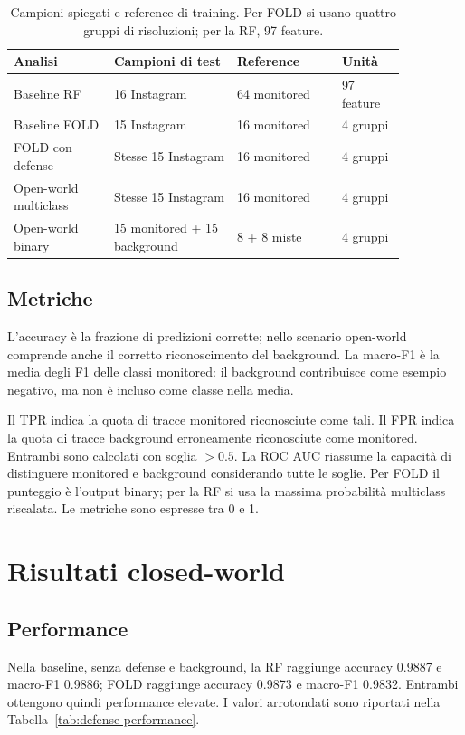\documentclass[11pt,a4paper]{article}
\begin{document}
\begin{table}[htbp]
\centering\small
\caption{Campioni spiegati e reference di training. Per FOLD si usano quattro gruppi di risoluzioni; per la RF, 97 feature.}
\label{tab:cohorts}
\begin{tabular}{p{0.22\linewidth}p{0.27\linewidth}p{0.23\linewidth}p{0.14\linewidth}}
\toprule
Analisi & Campioni di test & Reference & Unità \\
\midrule
Baseline RF & 16 Instagram & 64 monitored & 97 feature \\
Baseline FOLD & 15 Instagram & 16 monitored & 4 gruppi \\
FOLD con defense & Stesse 15 Instagram & 16 monitored & 4 gruppi \\
Open-world multiclass & Stesse 15 Instagram & 16 monitored & 4 gruppi \\
Open-world binary & 15 monitored + 15 background & 8 + 8 miste & 4 gruppi \\
\bottomrule
\end{tabular}
\end{table}

\subsection{Metriche}
L'accuracy è la frazione di predizioni corrette; nello scenario open-world comprende anche il corretto riconoscimento del background. La macro-F1 è la media degli F1 delle classi monitored: il background contribuisce come esempio negativo, ma non è incluso come classe nella media.

Il TPR indica la quota di tracce monitored riconosciute come tali. Il FPR indica la quota di tracce background erroneamente riconosciute come monitored. Entrambi sono calcolati con soglia $>0.5$. La ROC AUC riassume la capacità di distinguere monitored e background considerando tutte le soglie. Per FOLD il punteggio è l'output binary; per la RF si usa la massima probabilità multiclass riscalata. Le metriche sono espresse tra 0 e 1.

\section{Risultati closed-world}
\subsection{Performance}
Nella baseline, senza defense e background, la RF raggiunge accuracy 0.9887 e macro-F1 0.9886; FOLD raggiunge accuracy 0.9873 e macro-F1 0.9832. Entrambi ottengono quindi performance elevate. I valori arrotondati sono riportati nella Tabella~\ref{tab:defense-performance}.
\end{document}
